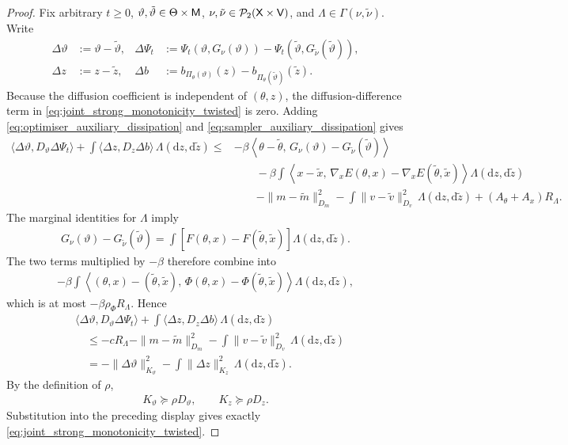 \begin{proof}
Fix arbitrary $t\geq0$,
$\vartheta,\tilde\vartheta\in\Theta\times{\mathsf{M}}$,
$\nu,\tilde\nu\in\mathcal P_2({\mathsf{X}}\times{\mathsf{V}})$, and
$\Lambda\in\Gamma(\nu,\tilde\nu)$.
Write
\begin{align*}
\Delta\vartheta&:=\vartheta-\tilde\vartheta,&
\Delta\Psi_t
&:=
\Psi_t(\vartheta,G_\nu(\vartheta))
-\Psi_t(\tilde\vartheta,G_{\tilde\nu}(\tilde\vartheta)),\\
\Delta z&:=z-\tilde z,&
\Delta b
&:=
b_{\Pi_\theta(\vartheta)}(z)
-b_{\Pi_\theta(\tilde\vartheta)}(\tilde z).
\end{align*}
Because the diffusion coefficient is independent of $(\theta,z)$, the
diffusion-difference term in
\eqref{eq:joint_strong_monotonicity_twisted} is zero.  Adding
\eqref{eq:optimiser_auxiliary_dissipation} and
\eqref{eq:sampler_auxiliary_dissipation} gives
\begin{align*}
\langle\Delta\vartheta,D_\vartheta\Delta\Psi_t\rangle
+
\int\langle\Delta z,D_z\Delta b\rangle\,
\Lambda(\mathrm dz,\mathrm d\tilde z)\leq &
-\beta
\left\langle
\theta-\tilde\theta,\,
G_\nu(\vartheta)-G_{\tilde\nu}(\tilde\vartheta)
\right\rangle\\
&\qquad
-\beta\int
\left\langle
x-\tilde x,\,
\nabla_xE(\theta,x)-\nabla_xE(\tilde\theta,\tilde x)
\right\rangle
\Lambda(\mathrm dz,\mathrm d\tilde z)\\
&\qquad
-\|m-\tilde m\|_{D_m}^2
-\int\|v-\tilde v\|_{D_v}^2\,
\Lambda(\mathrm dz,\mathrm d\tilde z)
+(A_\theta+A_x)R_\Lambda.
\end{align*}
The marginal identities for $\Lambda$ imply
\begin{align*}
G_\nu(\vartheta)-G_{\tilde\nu}(\tilde\vartheta)
=
\int
\left[
F(\theta,x)-F(\tilde\theta,\tilde x)
\right]
\Lambda(\mathrm dz,\mathrm d\tilde z).
\end{align*}
The two terms multiplied by $-\beta$ therefore combine into
\begin{align*}
-\beta
\int
\left\langle
(\theta,x)-(\tilde\theta,\tilde x),\,
\Phi(\theta,x)-\Phi(\tilde\theta,\tilde x)
\right\rangle
\Lambda(\mathrm dz,\mathrm d\tilde z),
\end{align*}
which is at most $-\beta\rho_\Phi R_\Lambda$.  Hence
\begin{align*}
&\langle\Delta\vartheta,D_\vartheta\Delta\Psi_t\rangle
+
\int\langle\Delta z,D_z\Delta b\rangle\,
\Lambda(\mathrm dz,\mathrm d\tilde z)\\
&\quad\leq
-cR_\Lambda
-\|m-\tilde m\|_{D_m}^2
-\int\|v-\tilde v\|_{D_v}^2\,
\Lambda(\mathrm dz,\mathrm d\tilde z)\\
&\quad=
-\|\Delta\vartheta\|_{K_\vartheta}^2
-\int\|\Delta z\|_{K_z}^2\,
\Lambda(\mathrm dz,\mathrm d\tilde z).
\end{align*}
By the definition of $\rho$,
\begin{align*}
K_\vartheta\succeq\rho D_\vartheta,
\qquad
K_z\succeq\rho D_z.
\end{align*}
Substitution into the preceding display gives exactly
\eqref{eq:joint_strong_monotonicity_twisted}.
\end{proof}

